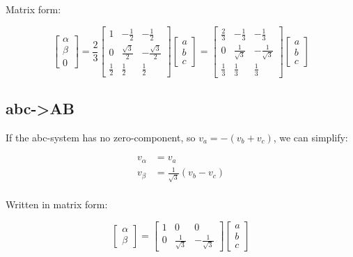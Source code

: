 \documentclass[]{book}
\begin{document}
Matrix form:

\[
\begin{bmatrix} \alpha\\ \beta \\ 0 \end{bmatrix}
= \frac{2}{3} \begin{bmatrix} 1 & -\frac{1}{2} & -\frac{1}{2} \\ 0 & \frac{\sqrt{3}}{2} & -\frac{\sqrt{3}}{2}
\\ \frac{1}{2} & \frac{1}{2} & \frac{1}{2}  \end{bmatrix}  
\begin{bmatrix} a\\ b \\ c \end{bmatrix}
= \begin{bmatrix} \frac{2}{3} & -\frac{1}{3} & -\frac{1}{3} \\ 0 & \frac{1}{\sqrt{3}} & -\frac{1}{\sqrt{3}}
\\ \frac{1}{3} & \frac{1}{3} & \frac{1}{3}\end{bmatrix}
\begin{bmatrix} a\\ b \\ c \end{bmatrix}
\label{eq:abcABZ2}
\]

\hypertarget{abc-ab}{%
\subsection{abc-\textgreater{}AB}\label{abc-ab}}

If the abc-system has no zero-component, so \(v_a=-(v_b+v_c)\), we can simplify:

\[
\begin{aligned}
v_\alpha &=   v_a\\
v_\beta &=  \frac{1}{\sqrt{3}} (v_b-v_c) \\
\end{aligned}
\label{eq:abcAB1}
\]

Written in matrix form:

\[
\begin{bmatrix} \alpha\\ \beta \end{bmatrix}
= \begin{bmatrix} 1 & 0 & 0 \\ 0 & \frac{1}{\sqrt{3}} & -\frac{1}{\sqrt{3}} \end{bmatrix}
\begin{bmatrix} a\\ b \\ c \end{bmatrix}
\label{eq:abcABmat1}
\]
\end{document}
